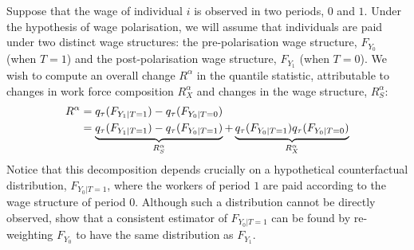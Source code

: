 Suppose that the wage of individual $i$ is observed in two periods, $0$ and $1$. Under the hypothesis of wage polarisation, we will assume that individuals are paid under two distinct wage structures: the pre-polarisation wage structure, $F_{Y_0}$ (when $T=1$) and the post-polarisation wage structure, $F_{Y_1}$ (when $T=0$). We wish to compute an overall change $R^\alpha$ in the quantile statistic, attributable to changes in work force composition $R^\alpha_X$ and changes in the wage structure, $R^\alpha_S$:
\begin{align}
  R^\alpha &= q_\tau(F_{Y_1|T=1}) - q_\tau(F_{Y_0|T=0}) \notag \\
  &= \underbrace{q_\tau(F_{Y_1|T=1}) -  q_\tau(F_{Y_0|T=1})}_{R^\alpha_S} + \underbrace{q_\tau(F_{Y_0|T=1}) q_\tau(F_{Y_0|T=0})}_{R^\alpha_X} \label{eq:decomp}
\end{align}Notice that this decomposition depends crucially on a hypothetical counterfactual distribution, $F_{Y_0|T=1}$, where the workers of period $1$ are paid according to the wage structure of period $0$. Although such a distribution cannot be directly observed, \citet{Firpo2011} show that a consistent estimator of $F_{Y_0|T=1}$ can be found by re-weighting $F_{Y_0}$ to have the same distribution as $F_{Y_1}$.

